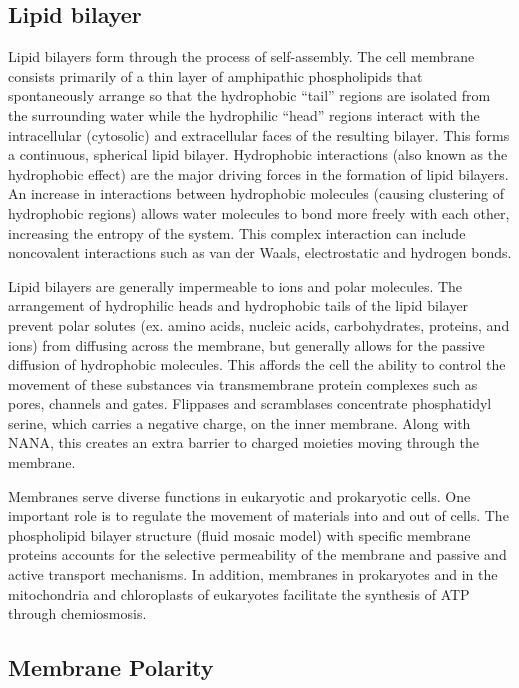 \hypertarget{lipid-bilayer}{%
\subsection{Lipid bilayer}\label{lipid-bilayer}}

Lipid bilayers form through the process of self-assembly. The cell membrane consists primarily of a thin layer of amphipathic phospholipids that spontaneously arrange so that the hydrophobic ``tail'' regions are isolated from the surrounding water while the hydrophilic ``head'' regions interact with the intracellular (cytosolic) and extracellular faces of the resulting bilayer. This forms a continuous, spherical lipid bilayer. Hydrophobic interactions (also known as the hydrophobic effect) are the major driving forces in the formation of lipid bilayers. An increase in interactions between hydrophobic molecules (causing clustering of hydrophobic regions) allows water molecules to bond more freely with each other, increasing the entropy of the system. This complex interaction can include noncovalent interactions such as van der Waals, electrostatic and hydrogen bonds.

Lipid bilayers are generally impermeable to ions and polar molecules. The arrangement of hydrophilic heads and hydrophobic tails of the lipid bilayer prevent polar solutes (ex. amino acids, nucleic acids, carbohydrates, proteins, and ions) from diffusing across the membrane, but generally allows for the passive diffusion of hydrophobic molecules. This affords the cell the ability to control the movement of these substances via transmembrane protein complexes such as pores, channels and gates. Flippases and scramblases concentrate phosphatidyl serine, which carries a negative charge, on the inner membrane. Along with NANA, this creates an extra barrier to charged moieties moving through the membrane.

Membranes serve diverse functions in eukaryotic and prokaryotic cells. One important role is to regulate the movement of materials into and out of cells. The phospholipid bilayer structure (fluid mosaic model) with specific membrane proteins accounts for the selective permeability of the membrane and passive and active transport mechanisms. In addition, membranes in prokaryotes and in the mitochondria and chloroplasts of eukaryotes facilitate the synthesis of ATP through chemiosmosis.

\hypertarget{membrane-polarity}{%
\subsection{Membrane Polarity}\label{membrane-polarity}}

